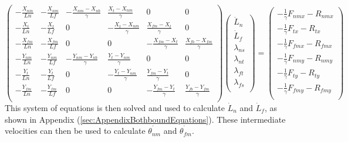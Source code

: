 \documentclass[9pt,twoside,lineno]{pnas-new}
\begin{document}
\[
\begin{pmatrix}
  -\frac{X_{nm}}{Ln} & -\frac{X_{nm}}{Lf}
  & -\frac{X_{nm}-X_{nb}}{\gamma} & \frac{X_{t}-X_{nm}}{\gamma} & 0 & 0\\
  -\frac{X_{t}}{Ln} & -\frac{X_{t}}{Lf}
  & 0 & -\frac{X_{t}-X_{nm}}{\gamma} & \frac{X_{fm}-X_{t}}{\gamma} & 0\\
  -\frac{X_{fm}}{Ln} & -\frac{X_{fm}}{Lf}
  & 0 & 0 & -\frac{X_{fm}-X_{t}}{\gamma} & \frac{X_{fb}-X_{fm}}{\gamma}\\
  -\frac{Y_{nm}}{Ln} & -\frac{Y_{nm}}{Lf}
  & -\frac{Y_{nm}-Y_{nb}}{\gamma} & \frac{Y_{t}-Y_{nm}}{\gamma} & 0 & 0\\
  -\frac{Y_{t}}{Ln} & -\frac{Y_{t}}{Lf}
  & 0 & -\frac{Y_{t}-Y_{nm}}{\gamma} & \frac{Y_{fm}-Y_{t}}{\gamma} & 0\\
  -\frac{Y_{fm}}{Ln} & -\frac{Y_{fm}}{Lf}
  & 0 & 0 & -\frac{Y_{fm}-Y_{t}}{\gamma} & \frac{Y_{fb}-Y_{fm}}{\gamma}\\
\end{pmatrix}
\begin{pmatrix}
  \dot{L}_n\\
  \dot{L}_f\\
  \lambda_{ns}\\
  \lambda_{nt}\\
  \lambda_{ft}\\
  \lambda_{fs}\\
\end{pmatrix}
=
\begin{pmatrix}
  -\frac{1}{\gamma}F_{nmx} - R_{nmx}\\
  -\frac{1}{\gamma}F_{tx}  - R_{tx}\\
  -\frac{1}{\gamma}F_{fmx} - R_{fmx}\\
  -\frac{1}{\gamma}F_{nmy} - R_{nmy}\\
  -\frac{1}{\gamma}F_{ty}  - R_{ty}\\
  -\frac{1}{\gamma}F_{fmy} - R_{fmy}\\
\end{pmatrix}
\]
%
This system of equations is then solved and used to calculate $\dot{L}_n$ and $\dot{L}_f$, as shown in Appendix (\ref{sec:AppendixBothboundEquations}). These intermediate velocities can then be used to calculate $\dot{\theta_{nm}}$ and $\dot{\theta_{fm}}$.\\


\end{document}
